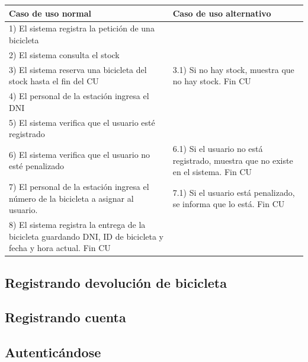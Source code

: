 \documentclass[a4paper, 10pt, twoside]{article}
\begin{document}
\begin{tabular}{| p{7cm} | p{7cm} |}
	\hline
	Caso de uso normal & Caso de uso alternativo \\ \hline
	1) El sistema registra la petición de una bicicleta &  \\ \hline
	2) El sistema consulta el stock & \\ \hline
	3) El sistema reserva una bicicleta del stock hasta el fin del CU & 3.1) Si no hay stock, muestra que no hay stock. Fin CU \\ \hline
	4) El personal de la estación ingresa el DNI & \\ \hline
	5) El sistema verifica que el usuario esté registrado & \\ \hline
	6) El sistema verifica que el usuario no esté penalizado & 6.1) Si el usuario no está registrado, muestra que no existe en el sistema. Fin CU \\ \hline
	7) El personal de la estación ingresa el número de la bicicleta a asignar al usuario. & 7.1) Si el usuario está penalizado, se informa que lo está. Fin CU \\ \hline
	8) El sistema registra la entrega de la bicicleta guardando DNI, ID de bicicleta y fecha y hora actual. Fin CU & \\
	\hline
\end{tabular}


\subsection{Registrando devolución de bicicleta}
\begin{usecase}
  \ucpre{}
  \ucpost{}
  \ucname{}
  \ucactor{}
\end{usecase}
\begin{usecasesteps}
  \ucstep{}{}
  \ucstep{}{}
  \ucstep{}{}
\end{usecasesteps}

\subsection{Registrando cuenta}
\begin{usecase}
  \ucpre{}
  \ucpost{}
  \ucname{}
  \ucactor{}
\end{usecase}
\begin{usecasesteps}
  \ucstep{}{}
  \ucstep{}{}
  \ucstep{}{}
\end{usecasesteps}

\subsection{Autenticándose}
\begin{usecase}
  \ucpre{}
  \ucpost{}
  \ucname{}
  \ucactor{}
\end{usecase}
\begin{usecasesteps}
  \ucstep{}{}
  \ucstep{}{}
  \ucstep{}{}
\end{usecasesteps}
\end{document}
